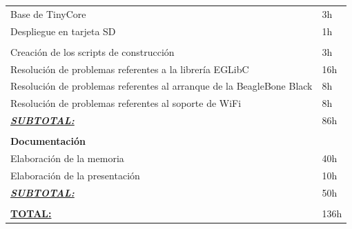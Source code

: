 \documentclass{tfg}
\begin{document}
\begin{center}
\begin{tabular}{ll}
Base de TinyCore                                                                      & 3h                   \\
Despliegue en tarjeta SD                                                              & 1h                   \\
\\
Creación de los scripts de construcción                                               & 3h                   \\
Resolución de problemas referentes a la librería EGLibC                                & 16h                  \\
Resolución de problemas referentes al arranque de la BeagleBone Black                  & 8h                   \\
Resolución de problemas referentes al soporte de WiFi                                  & 8h                   \\
{\ul \textit{\textbf{SUBTOTAL:}}}                                                     & 86h                  \\
\\
\textbf{Documentación}                                                                &                      \\
Elaboración de la memoria                                                             & 40h                  \\
Elaboración de la presentación                                                        & 10h                  \\
{\ul \textit{\textbf{SUBTOTAL:}}}                                                     & 50h                  \\
\\
{\ul \textbf{TOTAL:}}                                                                 & 136h
\end{tabular}
\end{center}
\end{document}
